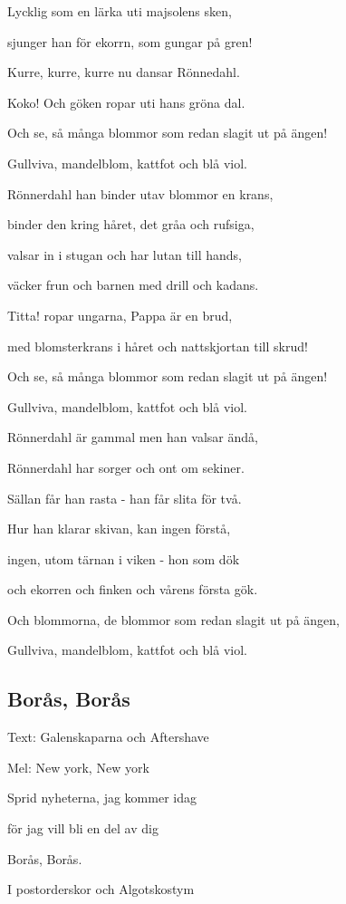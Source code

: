 Lycklig som en lärka uti majsolens sken,

sjunger han för ekorrn, som gungar på gren!

Kurre, kurre, kurre nu dansar Rönnedahl.

Koko! Och göken ropar uti hans gröna dal.

Och se, så många blommor som redan slagit ut på ängen!

Gullviva, mandelblom, kattfot och blå viol. \bigskip


Rönnerdahl han binder utav blommor en krans,

binder den kring håret, det gråa och rufsiga,

valsar in i stugan och har lutan till hands,

väcker frun och barnen med drill och kadans.

Titta! ropar ungarna, Pappa är en brud,

med blomsterkrans i håret och nattskjortan till skrud!

Och se, så många blommor som redan slagit ut på ängen!

Gullviva, mandelblom, kattfot och blå viol.\bigskip


Rönnerdahl är gammal men han valsar ändå,

Rönnerdahl har sorger och ont om sekiner.

Sällan får han rasta - han får slita för två.

Hur han klarar skivan, kan ingen förstå,

ingen, utom tärnan i viken - hon som dök

och ekorren och finken och vårens första gök.

Och blommorna, de blommor som redan slagit ut på ängen,

Gullviva, mandelblom, kattfot och blå viol. \bigskip


\subsection{\textbf{Borås, Borås}}

Text: Galenskaparna och Aftershave

Mel: New york, New york\bigskip


Sprid nyheterna, jag kommer idag

för jag vill bli en del av dig

Borås, Borås.\bigskip


I postorderskor och Algotskostym


